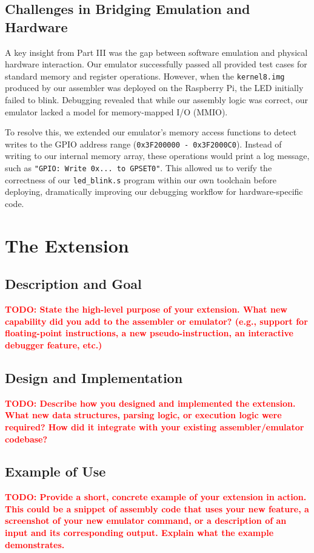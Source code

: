 \documentclass[11pt]{article}
\newcommand{\todo}[1]{\textcolor{red}{\textbf{TODO: #1}}}
\begin{document}
\subsection{Challenges in Bridging Emulation and Hardware}
A key insight from Part III was the gap between software emulation and physical hardware interaction. Our emulator successfully passed all provided test cases for standard memory and register operations. However, when the \texttt{kernel8.img} produced by our assembler was deployed on the Raspberry Pi, the LED initially failed to blink. Debugging revealed that while our assembly logic was correct, our emulator lacked a model for memory-mapped I/O (MMIO).

To resolve this, we extended our emulator's memory access functions to detect writes to the GPIO address range (\texttt{0x3F200000 - 0x3F2000C0}). Instead of writing to our internal memory array, these operations would print a log message, such as \texttt{"GPIO: Write 0x... to GPSET0"}. This allowed us to verify the correctness of our \texttt{led\_blink.s} program within our own toolchain before deploying, dramatically improving our debugging workflow for hardware-specific code.


\section{The Extension}

\subsection{Description and Goal}
\todo{State the high-level purpose of your extension. What new capability did you add to the assembler or emulator? (e.g., support for floating-point instructions, a new pseudo-instruction, an interactive debugger feature, etc.)}

\subsection{Design and Implementation}
\todo{Describe how you designed and implemented the extension. What new data structures, parsing logic, or execution logic were required? How did it integrate with your existing assembler/emulator codebase?}

\subsection{Example of Use}
\todo{Provide a short, concrete example of your extension in action. This could be a snippet of assembly code that uses your new feature, a screenshot of your new emulator command, or a description of an input and its corresponding output. Explain what the example demonstrates.}
\end{document}
